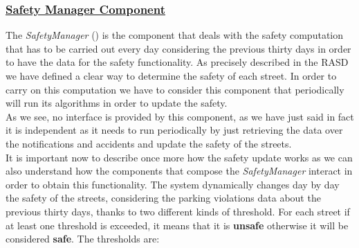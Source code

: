 		\subsubsection[Safety Manager Component]{\hyperlink{toc}{Safety Manager Component}}
			\label{sec:safetyManagerComponent}
			
			The \emph{SafetyManager} () is the component that deals with the safety computation that has to be carried out every day considering the previous thirty days in order to have the data for the safety functionality. As precisely described in the RASD \cite{RASD} we have defined a clear way to determine the safety of each street. In order to carry on this computation we have to consider this component that periodically will run its algorithms in order to update the safety.\\
			
			As we see, no interface is provided by this component, as we have just said in fact it is independent as it needs to run periodically by just retrieving the data over the notifications and accidents and update the safety of the streets.\\
			
			It is important now to describe once more how the safety update works as we can also understand how the components that compose the \emph{SafetyManager} interact in order to obtain this functionality. The system dynamically changes day by day the safety of the streets, considering the parking violations data  about the previous thirty days, thanks to two different kinds of threshold. For each street if at least one threshold is exceeded, it means that it is \textbf{unsafe} otherwise it will be considered \textbf{safe}. The thresholds are:
			
